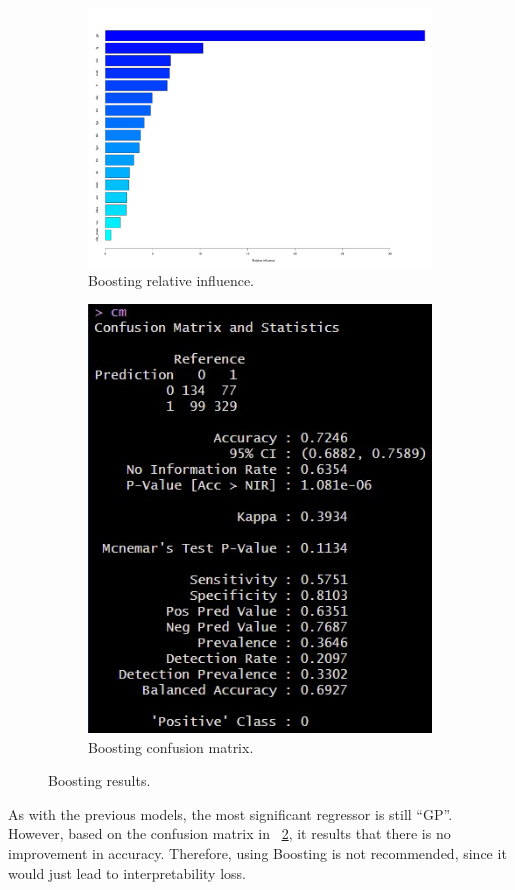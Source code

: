 \begin{figure}[H]
	\centering
	\begin{subfigure}{.5\textwidth}
		\centering
		\includegraphics[width=0.6\linewidth]{ImageFiles/Classification/Trees/boost_4_rel_inf}
		\caption{Boosting relative influence.}
		\label{fig:boost_4_rel_inf}
	\end{subfigure}%
	\hfill
	\begin{subfigure}{.5\textwidth}
		\centering
		\includegraphics[width=0.4\linewidth]{ImageFiles/Classification/Trees/boost_4_conf_mat}
		\caption{Boosting confusion matrix.}
		\label{fig:boost_4_conf_mat}
	\end{subfigure}
	\caption{Boosting results.}
	\label{BoostRes}
\end{figure}

As with the previous models, the most significant regressor is still ``GP''. However, based on the confusion matrix in \Fig~\ref{fig:boost_4_conf_mat}, it results that there is no improvement in accuracy. Therefore, using Boosting is not recommended, since it would just lead to interpretability loss.

